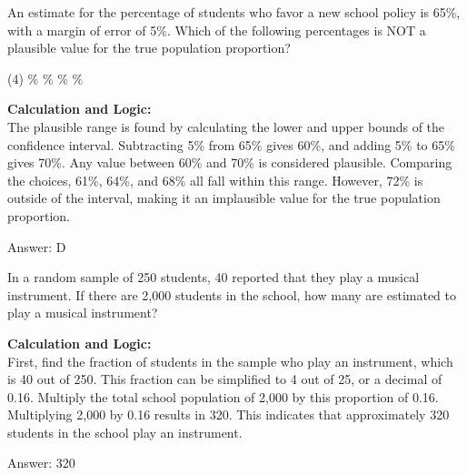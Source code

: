 \documentclass[11pt,paper=a4,answers]{exam}
\begin{document}
\begin{questions}
\vspace{60pt}

\question
An estimate for the percentage of students who favor a new school policy is 65\%, with a margin of error of 5\%. Which of the following percentages is NOT a plausible value for the true population proportion?
\begin{tasks}(4)
    \%
    \%
    \%
    \%
\end{tasks}

\begin{solution}
\textbf{Calculation and Logic:} \\
The plausible range is found by calculating the lower and upper bounds of the confidence interval. Subtracting 5\% from 65\% gives 60\%, and adding 5\% to 65\% gives 70\%. Any value between 60\% and 70\% is considered plausible. Comparing the choices, 61\%, 64\%, and 68\% all fall within this range. However, 72\% is outside of the interval, making it an implausible value for the true population proportion.

\vspace{30pt}

Answer: \colorbox{yellow!100}{D}
\end{solution}

\vspace{60pt}

\question
In a random sample of 250 students, 40 reported that they play a musical instrument. If there are 2,000 students in the school, how many are estimated to play a musical instrument?

\begin{solution}
\textbf{Calculation and Logic:} \\
First, find the fraction of students in the sample who play an instrument, which is 40 out of 250. This fraction can be simplified to 4 out of 25, or a decimal of 0.16. Multiply the total school population of 2,000 by this proportion of 0.16. Multiplying 2,000 by 0.16 results in 320. This indicates that approximately 320 students in the school play an instrument.

\vspace{30pt}

Answer: \colorbox{yellow!100}{320}
\end{solution}

\vspace{60pt}


\end{questions}
\end{document}
